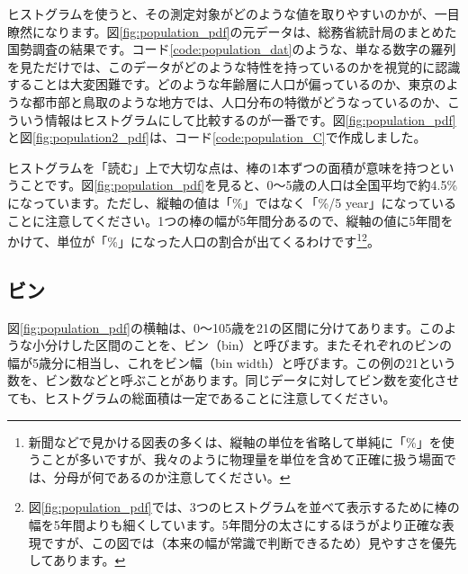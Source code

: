 ヒストグラムを使うと、その測定対象がどのような値を取りやすいのかが、一目瞭然になります。図\ref{fig:population_pdf}の元データは、総務省統計局のまとめた国勢調査の結果です。コード\ref{code:population_dat}のような、単なる数字の羅列を見ただけでは、このデータがどのような特性を持っているのかを視覚的に認識することは大変困難です。どのような年齢層に人口が偏っているのか、東京のような都市部と鳥取のような地方では、人口分布の特徴がどうなっているのか、こういう情報はヒストグラムにして比較するのが一番です。図\ref{fig:population_pdf}と図\ref{fig:population2_pdf}は、コード\ref{code:population_C}で作成しました。



ヒストグラムを「読む」上で大切な点は、棒の1本ずつの面積が意味を持つということです。図\ref{fig:population_pdf}を見ると、0〜5歳の人口は全国平均で約4.5\%になっています。ただし、縦軸の値は「\%」ではなく「\%/5 year」になっていることに注意してください。1つの棒の幅が5年間分あるので、縦軸の値に5年間をかけて、単位が「\%」になった人口の割合が出てくるわけです\footnote{新聞などで見かける図表の多くは、縦軸の単位を省略して単純に「\%」を使うことが多いですが、我々のように物理量を単位を含めて正確に扱う場面では、分母が何であるのか注意してください。}\footnote{図\ref{fig:population_pdf}では、3つのヒストグラムを並べて表示するために棒の幅を5年間よりも細くしています。5年間分の太さにするほうがより正確な表現ですが、この図では（本来の幅が常識で判断できるため）見やすさを優先してあります。}。



\subsection{ビン}

図\ref{fig:population_pdf}の横軸は、0〜105歳を21の区間に分けてあります。このような小分けした区間のことを、ビン（bin）と呼びます。またそれぞれのビンの幅が5歳分に相当し、これをビン幅（bin width）と呼びます。この例の21という数を、ビン数などと呼ぶことがあります。同じデータに対してビン数を変化させても、ヒストグラムの総面積は一定であることに注意してください。

